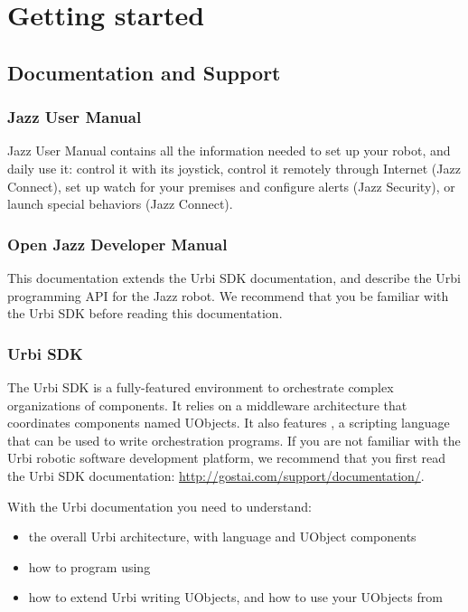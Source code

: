 
\chapter{Getting started}

\section{Documentation and Support}

\subsection{Jazz User Manual}

Jazz User Manual contains all the information needed to set up your robot,
and daily use it: control it with its joystick, control it remotely through
Internet (Jazz Connect), set up watch for your premises and configure alerts
(Jazz Security), or launch special behaviors (Jazz Connect).

{
  \subsection{Open Jazz Developer Manual}

  This documentation extends the Urbi SDK documentation, and describe the
  Urbi programming API for the Jazz robot. We recommend that you be familiar
  with the Urbi SDK before reading this documentation.

  \subsection{Urbi SDK}

  The Urbi SDK is a fully-featured environment to orchestrate complex
  organizations of components. It relies on a middleware architecture that
  coordinates components named UObjects. It also features \us, a scripting
  language that can be used to write orchestration programs. If you are not
  familiar with the Urbi robotic software development platform, we recommend
  that you first read the Urbi SDK documentation:
  \url{http://gostai.com/support/documentation/}.

  With the Urbi documentation you need to understand:
  \begin{itemize}
  \item the overall Urbi architecture, with \us language and UObject
    components
  \item how to program using \us
  \item how to extend Urbi writing UObjects, and how to use your UObjects
    from \us
  \end{itemize}
}

